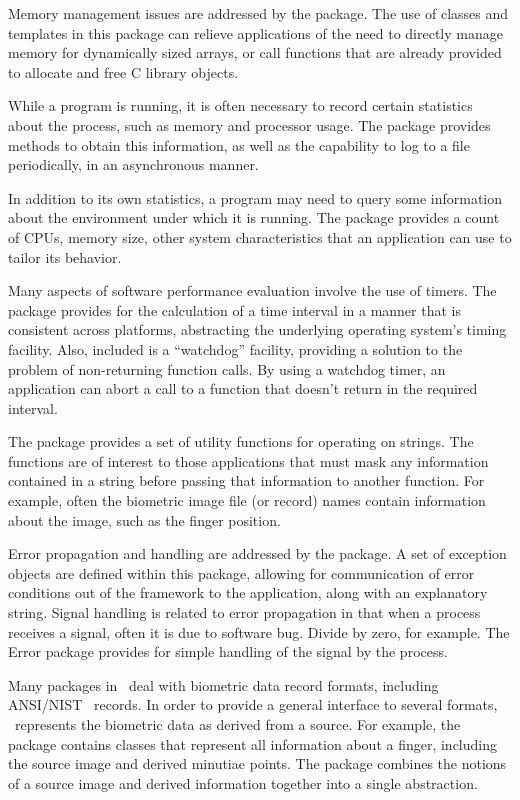 Memory management issues are addressed by the  package. The use
of classes and templates in this package can relieve applications of the need
to directly manage memory for dynamically sized arrays, or call functions
that are already provided to allocate and free C library objects.

While a program is running, it is often necessary to record certain statistics
about the process, such as memory and processor usage. The 
package provides methods to obtain this information, as well as the capability
to log to a file periodically, in an asynchronous manner.

In addition to its own statistics, a program may need to query some
information about the environment under which it is running. The 
package provides a count of CPUs, memory size, other system characteristics
that an application can use to tailor its behavior.

Many aspects of software performance evaluation involve the use of timers. The
 package provides for the calculation of a time interval in a manner
that is consistent across platforms, abstracting the underlying operating
system's timing facility. Also, included is a ``watchdog'' facility, providing
a solution to the problem of non-returning function calls. By using a watchdog
timer, an application can abort a call to a function that doesn't return in
the required interval.

The  package provides a set of utility functions for operating on
strings. The  functions are of interest to
those applications that must mask any information contained in a string before
passing that information to another function. For example, often the biometric
image file (or record) names contain information about the image, such as the
finger position.

Error propagation and handling are addressed by the  package. A set
of exception objects are defined within this package, allowing for communication
of error conditions out of the framework to the application, along with an
explanatory string. Signal handling is related to error propagation in that
when a process receives a signal, often it is due to software bug. Divide by
zero, for example. The Error package provides for simple handling of the signal 
by the process.

Many packages in \sname\ deal with biometric data record formats, including
ANSI/NIST~\cite{std::an2k} records. In order to provide a general interface
to several formats, \sname\ represents the biometric data as derived from
a source. For example, the  package contains classes that represent
all information about a finger, including the source image and derived
minutiae points. The  package combines the notions of a source
image and derived information together into a single abstraction.

